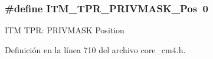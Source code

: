 \subsubsection[{\texorpdfstring{I\+T\+M\+\_\+\+T\+P\+R\+\_\+\+P\+R\+I\+V\+M\+A\+S\+K\+\_\+\+Pos}{ITM_TPR_PRIVMASK_Pos}}]{\setlength{\rightskip}{0pt plus 5cm}\#define I\+T\+M\+\_\+\+T\+P\+R\+\_\+\+P\+R\+I\+V\+M\+A\+S\+K\+\_\+\+Pos~0}\hypertarget{group___c_m_s_i_s___i_t_m_ga7abe5e590d1611599df87a1884a352e8}{}\label{group___c_m_s_i_s___i_t_m_ga7abe5e590d1611599df87a1884a352e8}
I\+TM T\+PR\+: P\+R\+I\+V\+M\+A\+SK Position 

Definición en la línea 710 del archivo core\+\_\+cm4.\+h.

